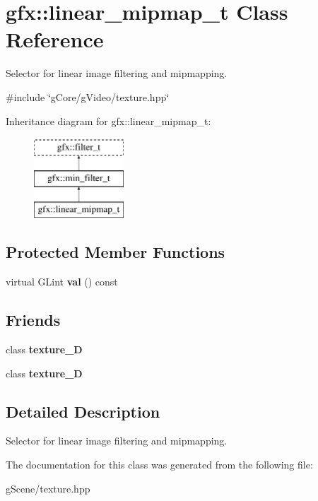 \hypertarget{classgfx_1_1linear__mipmap__t}{\section{gfx\-:\-:linear\-\_\-mipmap\-\_\-t Class Reference}
\label{classgfx_1_1linear__mipmap__t}
}


Selector for linear image filtering and mipmapping.  




{\ttfamily \#include \char`\"{}g\-Core/g\-Video/texture.\-hpp\char`\"{}}

Inheritance diagram for gfx\-:\-:linear\-\_\-mipmap\-\_\-t\-:\begin{figure}[H]
\begin{center}
\leavevmode
\includegraphics[height=3.000000cm]{classgfx_1_1linear__mipmap__t}
\end{center}
\end{figure}
\subsection*{Protected Member Functions}
\begin{DoxyCompactItemize}
\item 
\hypertarget{classgfx_1_1linear__mipmap__t_aeb5660ee2b7437160621b972f5886f31}{virtual G\-Lint {\bfseries val} () const }\label{classgfx_1_1linear__mipmap__t_aeb5660ee2b7437160621b972f5886f31}

\end{DoxyCompactItemize}
\subsection*{Friends}
\begin{DoxyCompactItemize}
\item 
\hypertarget{classgfx_1_1linear__mipmap__t_a2039d67f6166ccf823c78e3476aad9aa}{class {\bfseries texture\-\_\-D}}\label{classgfx_1_1linear__mipmap__t_a2039d67f6166ccf823c78e3476aad9aa}

\item 
\hypertarget{classgfx_1_1linear__mipmap__t_a22ad86ef46c3b17357a0cd59e50bc7dd}{class {\bfseries texture\-\_\-D}}\label{classgfx_1_1linear__mipmap__t_a22ad86ef46c3b17357a0cd59e50bc7dd}

\end{DoxyCompactItemize}


\subsection{Detailed Description}
Selector for linear image filtering and mipmapping. 

The documentation for this class was generated from the following file\-:\begin{DoxyCompactItemize}
\item 
g\-Scene/texture.\-hpp\end{DoxyCompactItemize}
